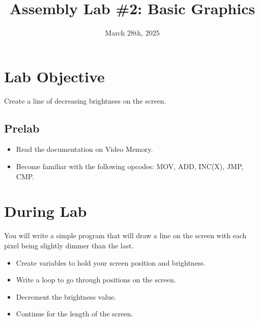 \documentclass[
	12pt, %
]{fphw}
\title{Assembly Lab \#2: Basic Graphics} %
\date{March 28th, 2025} %
\institute{Elizabethtown College \\ Department of Computer Science} %
\begin{document}
\maketitle %


\section*{Lab Objective}

\begin{problem}
	Create a line of decreasing brightness on the screen.  
\end{problem}


\subsection*{Prelab}

\begin{itemize}
  \item Read the documentation on Video Memory.
  \item Become familiar with the following opcodes: MOV, ADD, INC(X), JMP, CMP.
\end{itemize}


\section*{During Lab}

\begin{problem}
	You will write a simple program that will draw a line on the screen with each pixel being slightly dimmer than the last.
\end{problem}


\begin{itemize}
  \item Create variables to hold your screen position and brightness.
  \item Write a loop to go through positions on the screen.
  \item Decrement the brightness value.
  \item Continue for the length of the screen.
\end{itemize}
\end{document}
